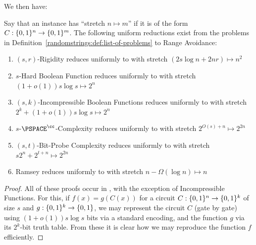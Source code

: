 We then have:
\begin{lemma}\label{randomstrings:lem:reductions}
Say that an \avoid instance has ``stretch $n \mapsto m$'' if it is of the form $C: \{0,1\}^n \to \{0,1\}^m$. The following uniform reductions exist from the problems in Definition~\ref{randomstrings:def:list-of-problems} to Range Avoidance:
\begin{enumerate}
    \item $(s,r)$-Rigidity reduces uniformly to \avoid with stretch $(2s \log n + 2nr) \mapsto n^2$
    \item $s$-Hard Boolean Function reduces uniformly to \avoid with stretch $(1+o(1))s\log s \mapsto 2^n$
    \item $(s,k)$-Incompressible Boolean Functions reduces uniformly to \avoid with stretch $2^k + (1+o(1))s\log s \mapsto 2^n$
    \item $s$-$\PSPACE^{\cc}$-Complexity reduces uniformly to \avoid with stretch $2^{O(s) + n} \mapsto 2^{2n}$
    \item $(s,t)$-Bit-Probe Complexity reduces uniformly to \avoid with stretch $s2^n + 2^{t + n} \mapsto 2^{2n}$
    \item Ramsey reduces uniformly to \avoid with stretch $n - \Omega(\log n) \mapsto n$
\end{enumerate}
\end{lemma}
\begin{proof}
All of these proofs occur in \cite{Korten21}, with the exception of Incompressible Functions. For this, if $f(x) = g(C(x))$ for a circuit $C: \{0,1\}^n \to \{0,1\}^k$ of size $s$ and $g: \{0,1\}^k \to \{0,1\}$, we may represent the circuit $C$ (gate by gate) using $(1+o(1))s\log s$ bits via a standard encoding, and the function $g$ via its $2^k$-bit truth table. From these it is clear how we may reproduce the function $f$ efficiently.
\end{proof}

